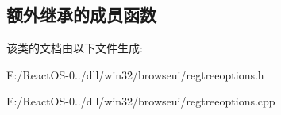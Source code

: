 \subsection*{额外继承的成员函数}


该类的文档由以下文件生成\+:\begin{DoxyCompactItemize}
\item 
E\+:/\+React\+O\+S-\/0../dll/win32/browseui/regtreeoptions.\+h\item 
E\+:/\+React\+O\+S-\/0../dll/win32/browseui/regtreeoptions.\+cpp\end{DoxyCompactItemize}
